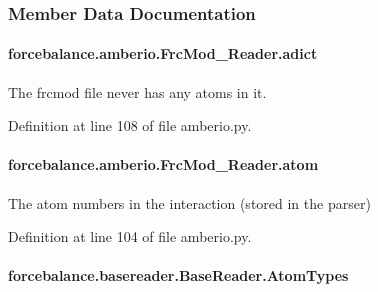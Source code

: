 \subsubsection{Member Data Documentation}
\hypertarget{classforcebalance_1_1amberio_1_1FrcMod__Reader_afee8f33a13244afd3f595acad27e04f4}{
\paragraph[{adict}]{\setlength{\rightskip}{0pt plus 5cm}forcebalance.\-amberio.\-Frc\-Mod\-\_\-\-Reader.\-adict}}\label{classforcebalance_1_1amberio_1_1FrcMod__Reader_afee8f33a13244afd3f595acad27e04f4}


The frcmod file never has any atoms in it. 



Definition at line 108 of file amberio.\-py.

\hypertarget{classforcebalance_1_1amberio_1_1FrcMod__Reader_a2e670a076d15771ee362f76e04a80419}{
\paragraph[{atom}]{\setlength{\rightskip}{0pt plus 5cm}forcebalance.\-amberio.\-Frc\-Mod\-\_\-\-Reader.\-atom}}\label{classforcebalance_1_1amberio_1_1FrcMod__Reader_a2e670a076d15771ee362f76e04a80419}


The atom numbers in the interaction (stored in the parser) 



Definition at line 104 of file amberio.\-py.

\hypertarget{classforcebalance_1_1basereader_1_1BaseReader_ad5765e192499937376950410364014af}{
\paragraph[{Atom\-Types}]{\setlength{\rightskip}{0pt plus 5cm}forcebalance.\-basereader.\-Base\-Reader.\-Atom\-Types\hspace{0.3cm}{\ttfamily [inherited]}}}\label{classforcebalance_1_1basereader_1_1BaseReader_ad5765e192499937376950410364014af}


